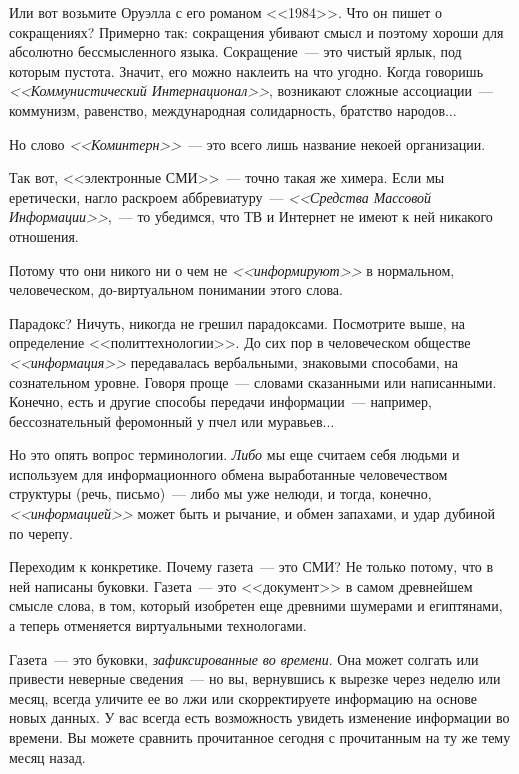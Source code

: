 \documentclass{scrbook}
\newcommand{\flqq}{<<}
\newcommand{\frqq}{>>}
\newcommand{\mdash}{~--- }
\newcommand{\commamdash}{~--- } %
\begin{document}
Или вот возьмите Оруэлла с его романом {\flqq}1984{\frqq}. Что он пишет о сокращениях? Примерно так: сокращения убивают смысл и поэтому хороши для абсолютно бессмысленного языка. Сокращение{\mdash}это чистый ярлык, под которым пустота. Значит, его можно наклеить на что угодно. Когда говоришь \emph{{\flqq}Коммунистический Интернационал{\frqq}}, возникают сложные ассоциации{\mdash}коммунизм, равенство, международная солидарность, братство народов...

Но слово \emph{{\flqq}Коминтерн{\frqq}}{\mdash}это всего лишь название некоей организации.

Так вот, {\flqq}электронные СМИ{\frqq}{\mdash}точно такая же химера. Если мы еретически, нагло раскроем аббревиатуру{\mdash}\emph{{\flqq}Средства Массовой Информации{\frqq}},{\commamdash}то убедимся, что ТВ и Интернет не имеют к ней никакого отношения.

Потому что они никого ни о чем не \emph{{\flqq}информируют{\frqq}} в нормальном, человеческом, до-виртуальном понимании этого слова.

Парадокс? Ничуть, никогда не грешил парадоксами. Посмотрите выше, на определение {\flqq}политтехнологии{\frqq}. До сих пор в человеческом обществе \emph{{\flqq}информация{\frqq}} передавалась вербальными, знаковыми способами, на сознательном уровне. Говоря проще{\mdash}словами сказанными или написанными. Конечно, есть и другие способы передачи информации{\mdash}например, бессознательный феромонный у пчел или муравьев...

Но это опять вопрос терминологии. \emph{Либо} мы еще считаем себя людьми и используем для информационного обмена выработанные человечеством структуры (речь, письмо){\mdash}либо мы уже нелюди, и тогда, конечно, \emph{{\flqq}информацией{\frqq}} может быть и рычание, и обмен запахами, и удар дубиной по черепу.

Переходим к конкретике. Почему газета{\mdash}это СМИ? Не только потому, что в ней написаны буковки. Газета{\mdash}это {\flqq}документ{\frqq} в самом древнейшем смысле слова, в том, который изобретен еще древними шумерами и египтянами, а теперь отменяется виртуальными технологами.

Газета{\mdash}это буковки, \emph{зафиксированные во времени}. Она может солгать или привести неверные сведения{\mdash}но вы, вернувшись к вырезке через неделю или месяц, всегда уличите ее во лжи или скорректируете информацию на основе новых данных. У вас всегда есть возможность увидеть изменение информации во времени. Вы можете сравнить прочитанное сегодня с прочитанным на ту же тему месяц назад.
\end{document}

